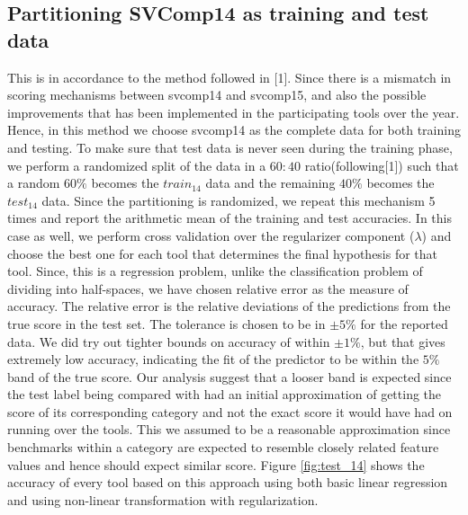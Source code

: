  \subsection{Partitioning SVComp14 as training and test data}
 This is in accordance to the method followed in [1]. Since there is a mismatch in scoring mechanisms between svcomp14 and svcomp15, and also the possible improvements that has been implemented in the participating tools over the year. Hence, in this method we choose svcomp14 as the complete data for both training and testing. To make sure that test data is never seen during the training phase, we perform a randomized split of the data in a $60:40$ ratio(following[1]) such that a random $60\%$ becomes the $train_{14}$ data and the remaining $40\%$ becomes the $test_{14}$ data. Since the partitioning is randomized, we repeat this mechanism 5 times and report the arithmetic mean of the training and test accuracies. In this case as well, we perform cross validation over the regularizer component ($\lambda$) and choose the best one for each tool that determines the final hypothesis for that tool. Since, this is a regression problem, unlike the classification problem of dividing into half-spaces, we have chosen relative error as the measure of accuracy. The relative error is the relative deviations of the predictions from the true score in the test set. The tolerance is chosen to be in $\pm 5\%$ for the reported data. We did try out tighter bounds on accuracy of within $\pm 1\%$, but that gives extremely low accuracy, indicating the fit of the predictor to be within the $5\%$ band of the true score. Our analysis suggest that a looser band is expected since the test label being compared with had an initial approximation of getting the score of its corresponding category and not the exact score it would have had on running over the tools. This we assumed to be a reasonable approximation since benchmarks within a category are expected to resemble closely related feature values and hence should expect similar score. Figure \ref{fig:test_14} shows the accuracy of every tool based on this approach using both basic linear regression and using non-linear transformation with regularization.
 
